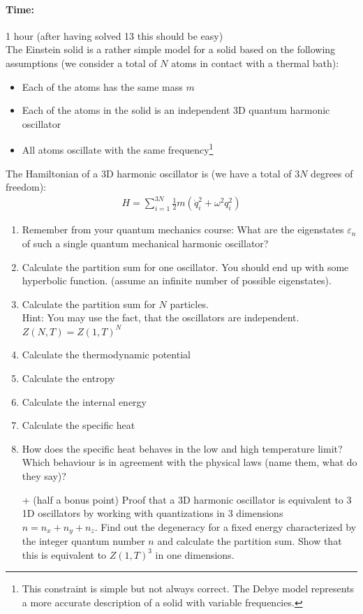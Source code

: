 \documentclass[12pt,a4paper]{article} %
\begin{document}
 \paragraph{Time:} 1 hour (after having solved 13 this should be easy) \\
 
 The Einstein solid is a rather simple model for a solid based on the following assumptions (we consider a total of $N$ atoms in contact with a thermal bath):
 \begin{itemize}
  \item Each of the atoms has the same mass $m$
  \item Each of the atoms in the solid is an independent 3D quantum harmonic oscillator 
  \item All atoms oscillate with the same frequency\footnote{This constraint is simple but not always correct. The Debye model represents a more accurate description of a solid with variable frequencies.}
 \end{itemize}

 The Hamiltonian of a 3D harmonic oscillator is (we have a total of $3N$ degrees of freedom):
 \begin{align}
  H = \sum_{i = 1}^{3N} \frac{1}{2} m (\dot{q}_i^2 + \omega^2 q_i^2)
 \end{align}
\begin{enumerate}
 \item Remember from your quantum mechanics course: What are the eigenstates $\varepsilon_n$ of such a single quantum mechanical harmonic oscillator? 
 \item Calculate the partition sum for one oscillator. You should end up with some hyperbolic function. (assume an infinite number of possible eigenstates).
 \item Calculate the partition sum for $N$ particles. \\
 Hint: You may use the fact, that the oscillators are independent. $Z(N,T) = Z(1,T)^N$
 \item Calculate the thermodynamic potential
 \item Calculate the entropy
 \item Calculate the internal energy
 \item Calculate the specific heat
 \item How does the specific heat behaves in the low and high temperature limit?\\
 Which behaviour is in agreement with the physical laws (name them, what do they say)?
 \item[+] (half a bonus point) Proof that a 3D harmonic oscillator is equivalent to 3 1D oscillators by working with quantizations in 3 dimensions $n = n_x + n_y + n_z$. Find out the degeneracy for a fixed  energy characterized by the integer quantum number $n$ and calculate the partition sum. Show that this is equivalent to $Z(1,T)^3$ in one dimensions.
\end{enumerate}
\end{document}
